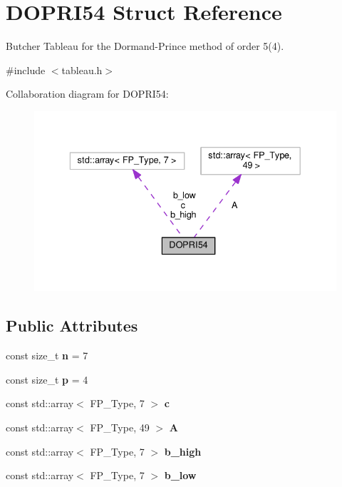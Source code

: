 \hypertarget{structDOPRI54}{}\section{D\+O\+P\+R\+I54 Struct Reference}
\label{structDOPRI54}


Butcher Tableau for the Dormand-\/\+Prince method of order 5(4).  




{\ttfamily \#include $<$tableau.\+h$>$}



Collaboration diagram for D\+O\+P\+R\+I54\+:\nopagebreak
\begin{figure}[H]
\begin{center}
\leavevmode
\includegraphics[width=336pt]{structDOPRI54__coll__graph}
\end{center}
\end{figure}
\subsection*{Public Attributes}
\begin{DoxyCompactItemize}
\item 
\mbox{\label{structDOPRI54_a5696f5102cc30b9d75e2ed881bbd6e97}} 
const size\+\_\+t {\bfseries n} = 7
\item 
\mbox{\label{structDOPRI54_a2ba7362999ab075d019a132607acba04}} 
const size\+\_\+t {\bfseries p} = 4
\item 
const std\+::array$<$ F\+P\+\_\+\+Type, 7 $>$ {\bfseries c}
\item 
const std\+::array$<$ F\+P\+\_\+\+Type, 49 $>$ {\bfseries A}
\item 
const std\+::array$<$ F\+P\+\_\+\+Type, 7 $>$ {\bfseries b\+\_\+high}
\item 
const std\+::array$<$ F\+P\+\_\+\+Type, 7 $>$ {\bfseries b\+\_\+low}
\end{DoxyCompactItemize}


